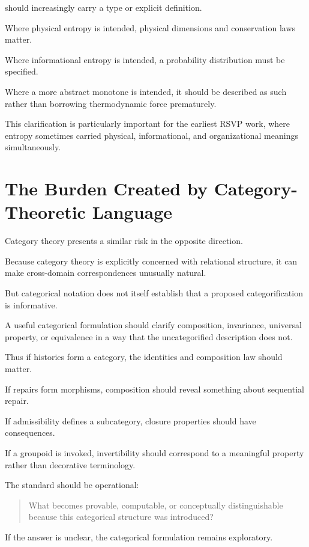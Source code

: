 \documentclass[11pt]{article}
\theoremstyle{remark}
\newcommand{\RSVP}{\textsc{RSVP}}
\begin{document}
should increasingly carry a type or explicit definition.

Where physical entropy is intended, physical dimensions and conservation laws
matter.

Where informational entropy is intended, a probability distribution must be
specified.

Where a more abstract monotone is intended, it should be described as such
rather than borrowing thermodynamic force prematurely.

This clarification is particularly important for the earliest \RSVP{} work,
where entropy sometimes carried physical, informational, and organizational
meanings simultaneously.

\section{The Burden Created by Category-Theoretic Language}

Category theory presents a similar risk in the opposite direction.

Because category theory is explicitly concerned with relational structure, it
can make cross-domain correspondences unusually natural.

But categorical notation does not itself establish that a proposed
categorification is informative.

A useful categorical formulation should clarify composition, invariance,
universal property, or equivalence in a way that the uncategorified description
does not.

Thus if histories form a category, the identities and composition law should
matter.

If repairs form morphisms, composition should reveal something about sequential
repair.

If admissibility defines a subcategory, closure properties should have
consequences.

If a groupoid is invoked, invertibility should correspond to a meaningful
property rather than decorative terminology.

The standard should be operational:

\begin{quote}
What becomes provable, computable, or conceptually distinguishable because this
categorical structure was introduced?
\end{quote}

If the answer is unclear, the categorical formulation remains exploratory.
\end{document}
